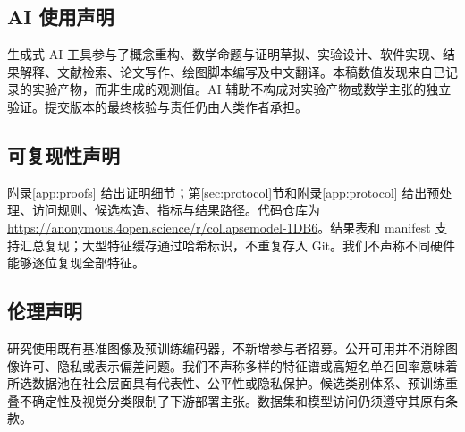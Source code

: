 \subsection*{AI 使用声明}
生成式 AI 工具参与了概念重构、数学命题与证明草拟、实验设计、软件实现、结果解释、文献检索、论文写作、绘图脚本编写及中文翻译。本稿数值发现来自已记录的实验产物，而非生成的观测值。AI 辅助不构成对实验产物或数学主张的独立验证。提交版本的最终核验与责任仍由人类作者承担。

\subsection*{可复现性声明}
附录\ref{app:proofs} 给出证明细节；第\ref{sec:protocol}节和附录\ref{app:protocol} 给出预处理、访问规则、候选构造、指标与结果路径。代码仓库为 \url{https://anonymous.4open.science/r/collapsemodel-1DB6}。结果表和 manifest 支持汇总复现；大型特征缓存通过哈希标识，不重复存入 Git。我们不声称不同硬件能够逐位复现全部特征。

\subsection*{伦理声明}
研究使用既有基准图像及预训练编码器，不新增参与者招募。公开可用并不消除图像许可、隐私或表示偏差问题。我们不声称多样的特征谱或高短名单召回率意味着所选数据池在社会层面具有代表性、公平性或隐私保护。候选类别体系、预训练重叠不确定性及视觉分类限制了下游部署主张。数据集和模型访问仍须遵守其原有条款。
